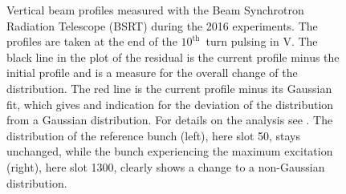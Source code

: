 \documentclass[%
 reprint,
 amsmath,amssymb,
 aps,
prstab,
]{revtex4-1}
\begin{document}
\begin{figure}[h]
\begin{minipage}[t]{0.49\linewidth}
	\end{minipage}
	\caption{\label{fig:10thexpprof} Vertical beam profiles measured with the Beam Synchrotron Radiation Telescope (BSRT) during the 2016 experiments. The profiles are taken at the end of the $10^{\mathrm{th}}$~turn pulsing in V. The black line in the plot of the residual is the current profile minus the initial profile and is a measure for the overall change of the distribution. The red line is the current profile minus its Gaussian fit, which gives and indication for the deviation of the distribution from a Gaussian distribution. For details on the analysis see \cite{bsrtprofinj}. The distribution of the reference bunch (left), here slot 50, stays unchanged, while the bunch experiencing the maximum excitation (right), here slot 1300, clearly shows a change to a non-Gaussian distribution.}
\end{figure}
\end{document}
